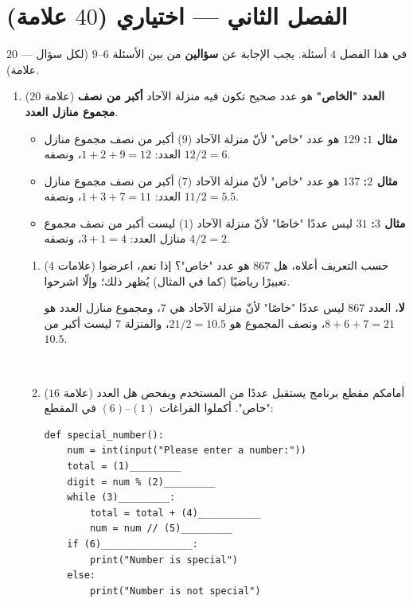 \documentclass[14pt]{extarticle}
\begin{document}
\clearpage
\section*{الفصل الثاني — اختياري ($40$ علامة)}
في هذا الفصل $4$ أسئلة. يجب الإجابة عن \textbf{سؤالين} من بين الأسئلة $6$–$9$ (لكل سؤال — $20$ علامة).

\begin{enumerate}[resume, label=\textbf{السؤال \arabic*:}, wide=0pt, itemsep=2.2em]

\item ($20$ علامة) \textbf{العدد "الخاص"} هو عدد صحيح تكون فيه منزلة الآحاد \textbf{أكبر من نصف مجموع منازل العدد}.
\begin{itemize}
\item \textbf{مثال $1$:} $129$ هو عدد "خاص" لأنّ منزلة الآحاد ($9$) أكبر من نصف مجموع منازل العدد: $1 + 2 + 9 = 12$، ونصفه $12 / 2 = 6$.
\item \textbf{مثال $2$:} $137$ هو عدد "خاص" لأنّ منزلة الآحاد ($7$) أكبر من نصف مجموع منازل العدد: $1 + 3 + 7 = 11$، ونصفه $11 / 2 = 5.5$.
\item \textbf{مثال $3$:} $31$ ليس عددًا "خاصًا" لأنّ منزلة الآحاد ($1$) ليست أكبر من نصف مجموع منازل العدد: $3 + 1 = 4$، ونصفه $4 / 2 = 2$.
\end{itemize}

\begin{enumerate}[label=\alph*.]
\item ($4$ علامات) حسب التعريف أعلاه، هل $867$ هو عدد "خاص"؟ إذا نعم، اعرضوا تعبيرًا رياضيًا (كما في المثال) يُظهر ذلك؛ وإلّا اشرحوا.
\ifwithsols
\begin{boxSolution}
\textbf{لا}، العدد $867$ ليس عددًا "خاصًا" لأنّ منزلة الآحاد هي $7$، ومجموع منازل العدد هو $8 + 6 + 7 = 21$، ونصف المجموع هو $21 / 2 = 10.5$، والمنزلة $7$ ليست أكبر من $10.5$.
\end{boxSolution}
\else
\\ \underline{\hspace{14cm}}
\fi
\filbreak

\item ($16$ علامة) أمامكم مقطع برنامج يستقبل عددًا من المستخدم ويفحص هل العدد "خاص". أكملوا الفراغات $(1)$–$(6)$ في المقطع:

\begin{boxCode}
\begin{english}
\begin{verbatim}
def special_number():
    num = int(input("Please enter a number:"))
    total = (1)_________
    digit = num % (2)_________
    while (3)_________:
        total = total + (4)___________
        num = num // (5)_________
    if (6)________________:
        print("Number is special")
    else:
        print("Number is not special")


\end{verbatim}
\end{english}
\end{boxCode}
\end{enumerate}
\end{enumerate}
\end{document}
